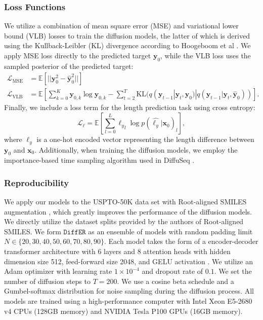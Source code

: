 \documentclass{article}
\newcommand{\ours}{$\texttt{DiffER}$\xspace}
\begin{document}
\subsubsection{Loss Functions}

We utilize a combination of mean square error (MSE) and variational lower bound (VLB) losses to train the diffusion models, the latter of which is derived using the Kullback-Leibler (KL) divergence according to Hoogeboom et al \cite{hoogeboom2021argmax}. We apply MSE loss directly to the predicted target $\bm{y}_0$, while the VLB loss uses the sampled posterior of the predicted target:
\begin{align}
    \mathcal{L}_{\text{MSE}} &= \mathbb{E}\left[||\bm{y}_0^2 - \hat{\bm{y}}_0^2||\right] \\
    \mathcal{L}_{\text{VLB}} &= \mathbb{E}\left[\sum_{k=0}^K\bm{y}_{0, k} \log \hat{\bm{y}}_{0, k} - \sum_{t=2}^T\text{KL}(q(\bm{y}_{t-1}| \bm{y}_t, \bm{y}_0) | q(\bm{y}_{t-1}| \bm{y}_t, \hat{\bm{y}}_0))\right].
\end{align}
Finally, we include a loss term for the length prediction task using cross entropy:
\begin{equation}
    \mathcal{L}_\ell = \mathbb{E}\left[\sum_{l=0}^L{\ell_y}_l\log p(\hat{\ell_y}|\bm{x}_0)_l\right],
\end{equation}
where $\ell_y$ is a one-hot encoded vector representing the length difference between $\bm{y}_{0}$ and $\bm{x}_0$. Additionally, when training the diffusion models, we employ the importance-based time sampling algorithm used in DiffuSeq \cite{gong2022diffuseq, gong2023diffuseq}.

\subsubsection{Reproducibility}

We apply our models to the USPTO-50K \cite{Lowe2017} data set with Root-aligned SMILES augmentation \cite{zhong2022root}, which greatly improves the performance of the diffusion models. We directly utilize the dataset splits provided by the authors of Root-aligned SMILES. We form \ours as an ensemble of models with random padding limit $N \in \{20, 30, 40, 50, 60, 70, 80, 90\}$. Each model takes the form of a encoder-decoder transformer architecture with 6 layers and 8 attention heads with hidden dimension size 512, feed-forward size 2048, and GELU activation \cite{hendrycks2016gaussian}. We utilize an Adam optimizer with learning rate $1\times 10^{-4}$ and dropout rate of $0.1$. We set the number of diffusion steps to $T=200$. We use a cosine beta schedule \cite{chen2023importance} and a Gumbel-softmax distribution for noise sampling during the diffusion process. All models are trained using a high-performance computer with Intel Xeon E5-2680 v4 CPUs (128GB memory) and NVIDIA Tesla P100 GPUs (16GB memory).
\end{document}
